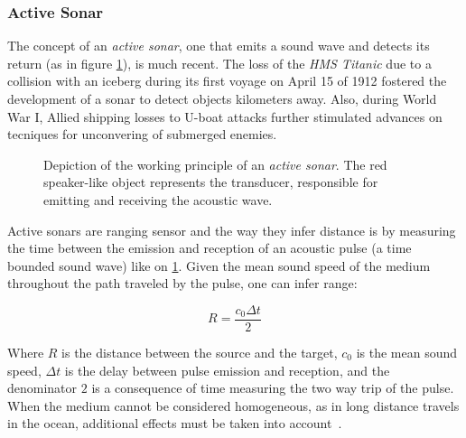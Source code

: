 
\subsubsection{Active Sonar}

The concept of an \textit{active sonar}, one that emits a sound wave and detects
its return (as in figure \ref{fig:sonar_principle}), is much recent. The
loss of the \textit{HMS Titanic} due to a collision with an iceberg during its
first voyage on April 15 of 1912 \cite{histsonar} fostered the development of a sonar
to detect objects kilometers away. Also, during World War I,
Allied shipping losses to U-boat attacks further stimulated advances on tecniques for
unconvering of submerged enemies.

\begin{figure}
	\centering
	
	\caption{Depiction of the working principle of an \textit{active sonar}. The
	red speaker-like object represents the transducer, responsible for
	emitting and receiving the acoustic wave.}
	\label{fig:sonar_principle}
\end{figure}

Active sonars are ranging sensor and the way they infer distance is by measuring
the time between the emission and reception of an acoustic pulse (a time bounded
sound wave) like on \ref{fig:sonar_principle}. Given the mean sound speed of the
medium throughout the path traveled by the pulse, one can infer range\cite{LURTON}:

\begin{equation}
R = \frac{c_0 \Delta t}{2}
\label{eq:delaytodistance}
\end{equation}


Where $R$ is the distance between the source and the target, $c_0$ is the mean
sound speed, $\Delta t$ is the delay between pulse emission and reception, and
the denominator $2$ is a consequence of time measuring the two way
trip of the pulse. When the medium cannot be considered homogeneous, as in long distance travels in
the ocean, additional effects must be taken into account~\cite{Etter2013}.



